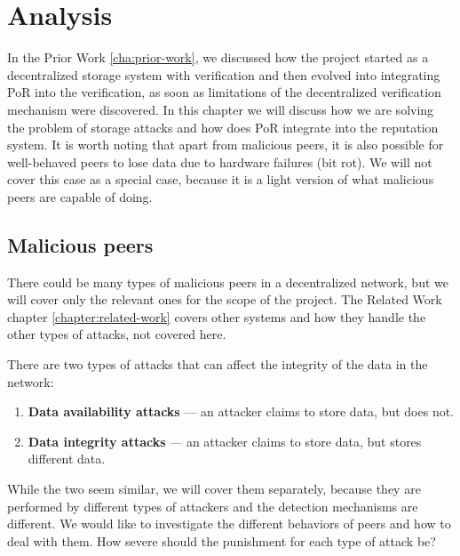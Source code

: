 \chapter{Analysis}
\label{chapter:analysis}

In the Prior Work \autoref{cha:prior-work}, we discussed how the project started as a decentralized
storage system with verification and then evolved into integrating PoR into the verification,
as soon as limitations of the decentralized verification mechanism were discovered.
In this chapter we will discuss how we are solving the problem of storage attacks
and how does PoR integrate into the reputation system.
It is worth noting that apart from malicious peers, it is also possible for well-behaved peers to
lose data due to hardware failures (bit rot).
We will not cover this case as a special case, because it is a light version of what malicious
peers are capable of doing.

\section{Malicious peers}

There could be many types of malicious peers in a decentralized network,
but we will cover only the relevant ones for the scope of the project.
The Related Work chapter \ref{chapter:related-work} covers other systems and
how they handle the other types of attacks, not covered here.

There are two types of attacks that can affect the integrity of the data in the network:
\begin{enumerate}
    \item \textbf{Data availability attacks} --- an attacker claims to store data, but does not.
    \item \textbf{Data integrity attacks} --- an attacker claims to store data, but stores different data.
\end{enumerate}

While the two seem similar, we will cover them separately, because they are performed by different types of attackers
and the detection mechanisms are different.
We would like to investigate the different behaviors of peers and how to deal with them.
How severe should the punishment for each type of attack be?


